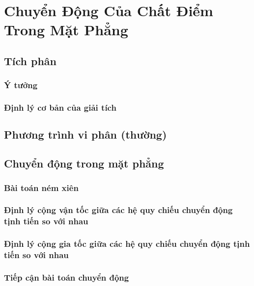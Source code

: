   
\chapter{Chuyển Động Của Chất Điểm Trong Mặt Phẳng}


\section{Tích phân}
\subsection{Ý tưởng}
\subsection{Định lý cơ bản của giải tích}

\section{Phương trình vi phân (thường)}

\section{Chuyển động trong mặt phẳng}
\subsection{Bài toán ném xiên}
\subsection{Định lý cộng vận tốc giữa các hệ quy chiếu chuyển động tịnh tiến so với nhau}
\subsection{Định lý cộng gia tốc giữa các hệ quy chiếu chuyển động tịnh tiến so với nhau}
\subsection{Tiếp cận bài toán chuyển động}